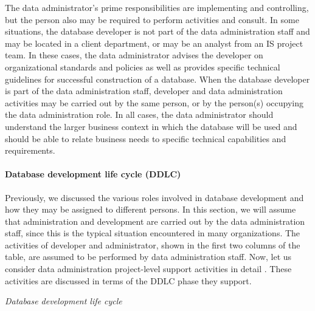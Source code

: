 \documentclass[
]{article}
\begin{document}
The data administrator's prime responsibilities are implementing and
controlling, but the person also may be required to perform activities
and consult. In some situations, the database developer is not part of
the data administration staff and may be located in a client department,
or may be an analyst from an IS project team. In these cases, the data
administrator advises the developer on organizational standards and
policies as well as provides specific technical guidelines for
successful construction of a database. When the database developer is
part of the data administration staff, developer and data administration
activities may be carried out by the same person, or by the person(s)
occupying the data administration role. In all cases, the data
administrator should understand the larger business context in which the
database will be used and should be able to relate business needs to
specific technical capabilities and requirements.

\hypertarget{database-development-life-cycle-ddlc}{%
\paragraph*{Database development life cycle (DDLC)}\label{database-development-life-cycle-ddlc}}

Previously, we discussed the various roles involved in database
development and how they may be assigned to different persons. In this
section, we will assume that administration and development are carried
out by the data administration staff, since this is the typical
situation encountered in many organizations. The activities of developer
and administrator, shown in the first two columns of the table, are
assumed to be performed by data administration staff. Now, let us
consider data administration project-level support activities in detail
. These activities are discussed in terms of the DDLC phase they
support.

\emph{Database development life cycle}
\end{document}

